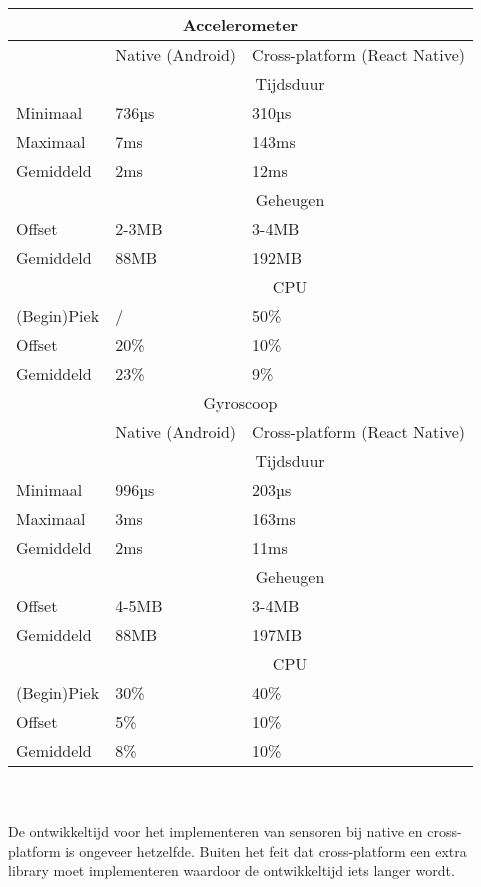 \begin{tabular}{ |p{3cm}||p{5cm}|p{5cm}| }
    \hline
    \multicolumn{3}{|c|}{Accelerometer} \\ 
    \hline
     & Native (Android) & Cross-platform (React Native) \\
    \hline
     & \multicolumn{2}{|c|}{Tijdsduur} \\
    \hline
    Minimaal & 736µs & 310µs \\
    Maximaal & 7ms & 143ms \\
    Gemiddeld & 2ms & 12ms \\
    \hline
     & \multicolumn{2}{|c|}{Geheugen} \\ 
    \hline
    Offset & 2-3MB & 3-4MB \\
    Gemiddeld & 88MB & 192MB \\
    \hline
     & \multicolumn{2}{|c|}{CPU} \\
    \hline
    (Begin)Piek & / & 50\% \\
    Offset & 20\% & 10\% \\
    Gemiddeld & 23\% & 9\% \\
    \hline
    \multicolumn{3}{|c|}{Gyroscoop} \\ 
    \hline
     & Native (Android) & Cross-platform (React Native) \\
    \hline
     & \multicolumn{2}{|c|}{Tijdsduur} \\
    \hline
    Minimaal & 996µs & 203µs \\
    Maximaal & 3ms & 163ms \\
    Gemiddeld & 2ms & 11ms \\
    \hline
     & \multicolumn{2}{|c|}{Geheugen} \\ 
    \hline
    Offset & 4-5MB & 3-4MB \\
    Gemiddeld & 88MB & 197MB \\
    \hline
     & \multicolumn{2}{|c|}{CPU} \\
    \hline
    (Begin)Piek & 30\% & 40\% \\
    Offset & 5\% & 10\% \\
    Gemiddeld & 8\% & 10\% \\
    \hline
\end{tabular}
\\\\
De ontwikkeltijd voor het implementeren van sensoren
bij native en cross-platform is ongeveer hetzelfde. Buiten het feit dat cross-platform een extra library moet
implementeren waardoor de ontwikkeltijd iets langer wordt. 
